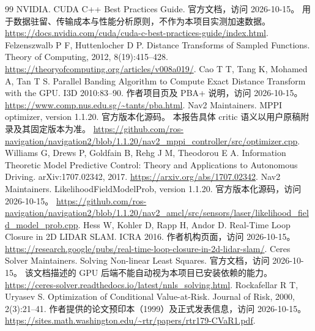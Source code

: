 \begin{thebibliography}{99}
\small
{}
NVIDIA. CUDA C++ Best Practices Guide. 官方文档，访问 2026-10-15。
用于数据驻留、传输成本与性能分析原则，不作为本项目实测加速数据。
\url{https://docs.nvidia.com/cuda/cuda-c-best-practices-guide/index.html}.
Felzenszwalb P F, Huttenlocher D P. Distance Transforms of Sampled Functions.
Theory of Computing, 2012, 8(19):415--428.
\url{https://theoryofcomputing.org/articles/v008a019/}.
Cao T T, Tang K, Mohamed A, Tan T S.
Parallel Banding Algorithm to Compute Exact Distance Transform with the GPU.
I3D 2010:83--90. 作者项目页及 PBA+ 说明，访问 2026-10-15。
\url{https://www.comp.nus.edu.sg/~tants/pba.html}.
Nav2 Maintainers. MPPI optimizer, version 1.1.20. 官方版本化源码。
本报告具体 critic 语义以用户原稿附录及其固定版本为准。
\url{https://github.com/ros-navigation/navigation2/blob/1.1.20/nav2_mppi_controller/src/optimizer.cpp}.
Williams G, Drews P, Goldfain B, Rehg J M, Theodorou E A.
Information Theoretic Model Predictive Control: Theory and Applications to Autonomous Driving.
arXiv:1707.02342, 2017.
\url{https://arxiv.org/abs/1707.02342}.
Nav2 Maintainers. LikelihoodFieldModelProb, version 1.1.20. 官方版本化源码，访问 2026-10-15。
\url{https://github.com/ros-navigation/navigation2/blob/1.1.20/nav2_amcl/src/sensors/laser/likelihood_field_model_prob.cpp}.
Hess W, Kohler D, Rapp H, Andor D.
Real-Time Loop Closure in 2D LIDAR SLAM. ICRA 2016.
作者机构页面，访问 2026-10-15。
\url{https://research.google/pubs/real-time-loop-closure-in-2d-lidar-slam/}.
Ceres Solver Maintainers. Solving Non-linear Least Squares.
官方文档，访问 2026-10-15。
该文档描述的 GPU 后端不能自动视为本项目已安装依赖的能力。
\url{https://ceres-solver.readthedocs.io/latest/nnls_solving.html}.
Rockafellar R T, Uryasev S. Optimization of Conditional Value-at-Risk.
Journal of Risk, 2000, 2(3):21--41.
作者提供的论文预印本（1999）及正式发表信息，访问 2026-10-15。
\url{https://sites.math.washington.edu/~rtr/papers/rtr179-CVaR1.pdf}.
\end{thebibliography}
